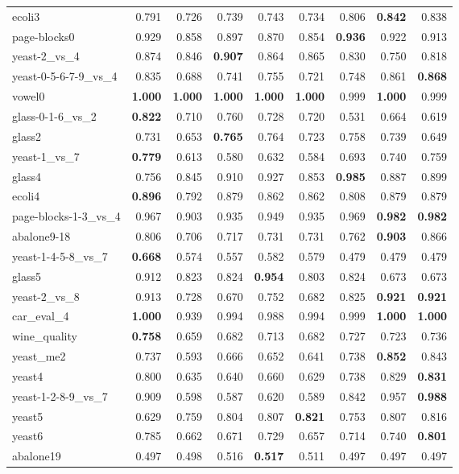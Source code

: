 \begin{table}[!hhbp]
{\begin{tabular}{lrrrrrrrr}
			ecoli3 & 0.791 & 0.726 & 0.739 & 0.743 & 0.734 & 0.806 & \textbf{0.842} & 0.838 \\
			page-blocks0 & 0.929 & 0.858 & 0.897 & 0.870 & 0.854 & \textbf{0.936} & 0.922 & 0.913 \\
			yeast-2\_vs\_4 & 0.874 & 0.846 & \textbf{0.907} & 0.864 & 0.865 & 0.830 & 0.750 & 0.818 \\
			yeast-0-5-6-7-9\_vs\_4 & 0.835 & 0.688 & 0.741 & 0.755 & 0.721 & 0.748 & 0.861 & \textbf{0.868} \\
			vowel0 & \textbf{1.000} & \textbf{1.000} & \textbf{1.000} & \textbf{1.000} & \textbf{1.000} & 0.999 & \textbf{1.000} & 0.999 \\
			glass-0-1-6\_vs\_2 & \textbf{0.822} & 0.710 & 0.760 & 0.728 & 0.720 & 0.531 & 0.664 & 0.619 \\
			glass2 & 0.731 & 0.653 & \textbf{0.765} & 0.764 & 0.723 & 0.758 & 0.739 & 0.649 \\
			yeast-1\_vs\_7 & \textbf{0.779} & 0.613 & 0.580 & 0.632 & 0.584 & 0.693 & 0.740 & 0.759 \\
			glass4 & 0.756 & 0.845 & 0.910 & 0.927 & 0.853 & \textbf{0.985} & 0.887 & 0.899 \\
			ecoli4 & \textbf{0.896} & 0.792 & 0.879 & 0.862 & 0.862 & 0.808 & 0.879 & 0.879 \\
			page-blocks-1-3\_vs\_4 & 0.967 & 0.903 & 0.935 & 0.949 & 0.935 & 0.969 & \textbf{0.982} & \textbf{0.982} \\
			abalone9-18 & 0.806 & 0.706 & 0.717 & 0.731 & 0.731 & 0.762 & \textbf{0.903} & 0.866 \\
			yeast-1-4-5-8\_vs\_7 & \textbf{0.668} & 0.574 & 0.557 & 0.582 & 0.579 & 0.479 & 0.479 & 0.479 \\
			glass5 & 0.912 & 0.823 & 0.824 & \textbf{0.954} & 0.803 & 0.824 & 0.673 & 0.673 \\
			yeast-2\_vs\_8 & 0.913 & 0.728 & 0.670 & 0.752 & 0.682 & 0.825 & \textbf{0.921} & \textbf{0.921} \\
			car\_eval\_4 & \textbf{1.000} & 0.939 & 0.994 & 0.988 & 0.994 & 0.999 & \textbf{1.000} & \textbf{1.000} \\
			wine\_quality & \textbf{0.758} & 0.659 & 0.682 & 0.713 & 0.682 & 0.727 & 0.723 & 0.736 \\
			yeast\_me2 & 0.737 & 0.593 & 0.666 & 0.652 & 0.641 & 0.738 & \textbf{0.852} & 0.843 \\
			yeast4 & 0.800 & 0.635 & 0.640 & 0.660 & 0.629 & 0.738 & 0.829 & \textbf{0.831} \\
			yeast-1-2-8-9\_vs\_7 & 0.909 & 0.598 & 0.587 & 0.620 & 0.589 & 0.842 & 0.957 & \textbf{0.988} \\
			yeast5 & 0.629 & 0.759 & 0.804 & 0.807 & \textbf{0.821} & 0.753 & 0.807 & 0.816 \\
			yeast6 & 0.785 & 0.662 & 0.671 & 0.729 & 0.657 & 0.714 & 0.740 & \textbf{0.801} \\
			abalone19 & 0.497 & 0.498 & 0.516 & \textbf{0.517} & 0.511 & 0.497 & 0.497 & 0.497 \\
			\bottomrule
		\end{tabular}%
		
	}
	\label{tab:Precision}%
\end{table}%

